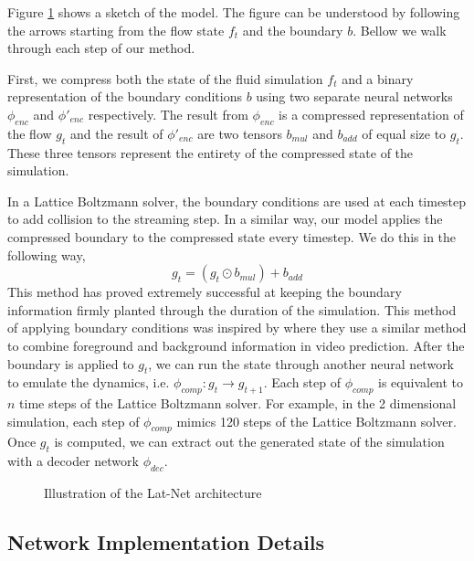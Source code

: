 \documentclass{article}
\begin{document}
Figure \ref{fig_1} shows a sketch of the model. The figure can be understood by following the arrows starting from the flow state $f_t$ and the boundary $b$. Bellow we walk through each step of our method.

First, we compress both the state of the fluid simulation $f_t$ and a binary representation of the boundary conditions $b$ using two separate neural networks $\phi_{enc}$ and $\phi'_{enc}$ respectively. The result from $\phi_{enc}$ is a compressed representation of the flow $g_t$ and the result of $\phi'_{enc}$ are two tensors $b_{mul}$ and $b_{add}$ of equal size to $g_t$. These three tensors represent the entirety of the compressed state of the simulation.

In a Lattice Boltzmann solver, the boundary conditions are used at each timestep to add collision to the streaming step. In a similar way, our model applies the compressed boundary to the compressed state every timestep. We do this in the following way,
\begin{equation}
  g_t = (g_t \odot b_{mul}) + b_{add}
\end{equation}
This method has proved extremely successful at keeping the boundary information firmly planted through the duration of the simulation. This method of applying boundary conditions was inspired by \cite{vondrick2016generating} where they use a similar method to combine foreground and background information in video prediction. After the boundary is applied to $g_t$, we can run the state through another neural network to emulate the dynamics, i.e. $\phi_{comp}:g_{t} \rightarrow g_{t+1}$. Each step of $\phi_{comp}$ is equivalent to $n$ time steps of the Lattice Boltzmann solver. For example, in the 2 dimensional simulation, each step of $\phi_{comp}$ mimics 120 steps of the Lattice Boltzmann solver. Once $g_t$ is computed, we can extract out the generated state of the simulation with a decoder network $\phi_{dec}$. 

\begin{figure}[!t]
\centering
{}
\caption{Illustration of the Lat-Net architecture}
\label{fig_1}
\end{figure}

\subsection{Network Implementation Details}
\end{document}
